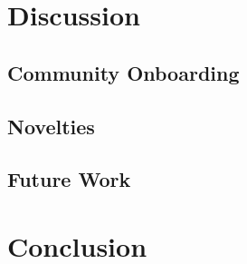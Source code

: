 \section{Discussion}
\subsection{Community Onboarding}

\subsection{Novelties}

\subsection{Future Work}

\section{Conclusion}
